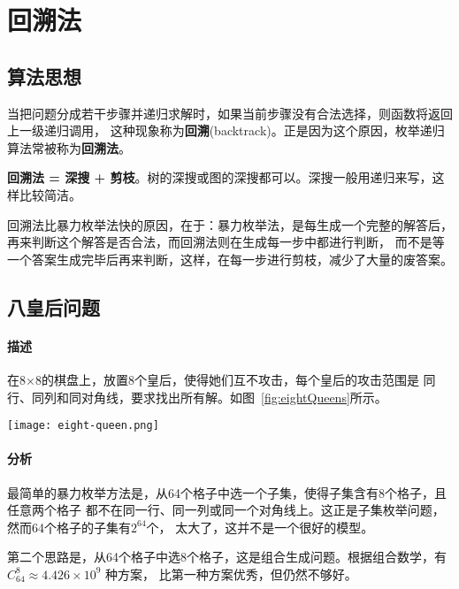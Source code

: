 \chapter{回溯法}

\section{算法思想} %

当把问题分成若干步骤并递归求解时，如果当前步骤没有合法选择，则函数将返回上一级递归调用，
这种现象称为\textbf{回溯}(backtrack)。正是因为这个原因，枚举递归算法常被称为\textbf{回溯法}。

\textbf{回溯法 = 深搜 + 剪枝}。树的深搜或图的深搜都可以。深搜一般用递归来写，这样比较简洁。

回溯法比暴力枚举法快的原因，在于：暴力枚举法，是每生成一个完整的解答后，
再来判断这个解答是否合法，而回溯法则在生成每一步中都进行判断，
而不是等一个答案生成完毕后再来判断，这样，在每一步进行剪枝，减少了大量的废答案。

\section{八皇后问题} %

\subsubsection{描述}
在8×8的棋盘上，放置8个皇后，使得她们互不攻击，每个皇后的攻击范围是
同行、同列和同对角线，要求找出所有解。如图~\ref{fig:eightQueens}所示。

\begin{center}
\texttt{[image: eight-queen.png]} \\
\label{fig:eightQueens}
\end{center}

\subsubsection{分析}
最简单的暴力枚举方法是，从64个格子中选一个子集，使得子集含有8个格子，且任意两个格子
都不在同一行、同一列或同一个对角线上。这正是子集枚举问题，然而64个格子的子集有$2^{64}$个，
太大了，这并不是一个很好的模型。

第二个思路是，从64个格子中选8个格子，这是组合生成问题。根据组合数学，有 $C_{64}^{8} \approx 4.426 \times 10^9$ 种方案，
比第一种方案优秀，但仍然不够好。

